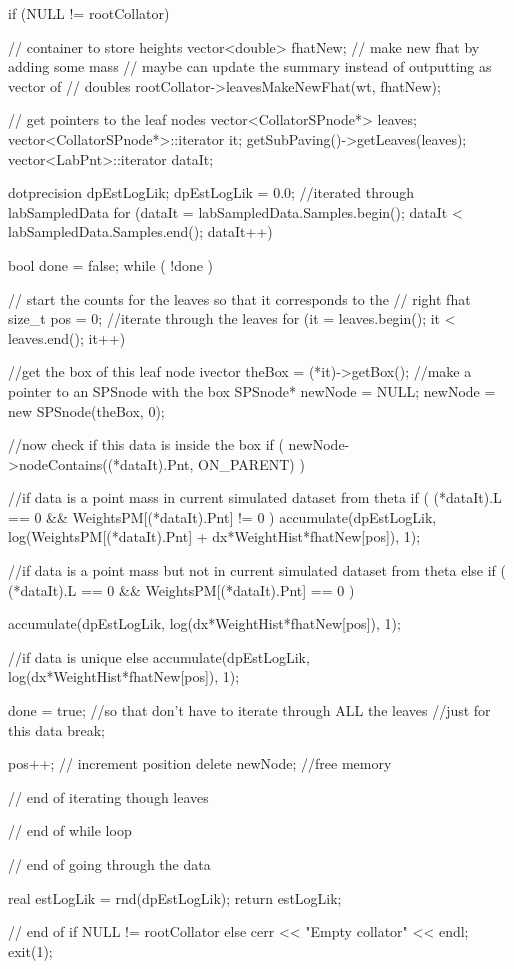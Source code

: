 \begin{DoxyCode}
{
  if (NULL != rootCollator) {     
    // container to store heights
    vector<double> fhatNew;         
      // make new fhat by adding some mass
      // maybe can update the summary instead of outputting as vector of
      // doubles
    rootCollator->leavesMakeNewFhat(wt, fhatNew);

    // get pointers to the leaf nodes
    vector<CollatorSPnode*> leaves;
    vector<CollatorSPnode*>::iterator it;
    getSubPaving()->getLeaves(leaves); 
    vector<LabPnt>::iterator dataIt;

    dotprecision dpEstLogLik;
    dpEstLogLik = 0.0;
    //iterated through labSampledData
    for (dataIt = labSampledData.Samples.begin(); 
      dataIt < labSampledData.Samples.end(); dataIt++) {
      bool done = false;
      while ( !done ) {
        // start the counts for the leaves so that it corresponds to the 
        // right fhat
        size_t pos = 0;
        //iterate through the leaves
        for (it = leaves.begin(); it < leaves.end(); it++) {
          //get the box of this leaf node
          ivector theBox = (*it)->getBox();
          //make a pointer to an SPSnode with the box
          SPSnode* newNode = NULL;
          newNode = new SPSnode(theBox, 0);
        
          //now check if this data is inside the box
          if ( newNode->nodeContains((*dataIt).Pnt, ON_PARENT) ) {  
            
            //if data is a point mass in current simulated dataset from theta
            if ( (*dataIt).L == 0 && WeightsPM[(*dataIt).Pnt] != 0 ) {       
              accumulate(dpEstLogLik, 
              log(WeightsPM[(*dataIt).Pnt] + dx*WeightHist*fhatNew[pos]), 1);       
            }
            
            //if data is a point mass but not in current simulated dataset from
       theta
            else if ( (*dataIt).L == 0 && WeightsPM[(*dataIt).Pnt] == 0 ) {     
       
              accumulate(dpEstLogLik, log(dx*WeightHist*fhatNew[pos]), 1);        
            } 

            //if data is unique
            else {
              accumulate(dpEstLogLik, log(dx*WeightHist*fhatNew[pos]), 1);
            }
            
            done = true; //so that don't have to iterate through ALL the leaves
                      //just for this data
            break;
          }
          pos++; // increment position
          delete newNode; //free memory
        } // end of iterating though leaves
      } // end of while loop 
      
    } // end of going through the data
      
    real estLogLik = rnd(dpEstLogLik);
    return estLogLik;
  } // end of if NULL != rootCollator
  else { cerr << "Empty collator" << endl; exit(1); }
}
\end{DoxyCode}
